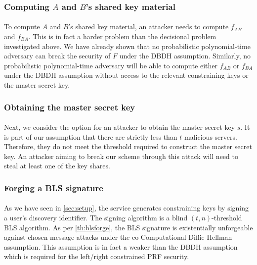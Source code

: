 \subsubsection{Computing $A$ and $B$'s shared key material}

\paragraph{} To compute $A$ and $B$'s shared key material, an attacker needs to compute $f_{AB}$ and $f_{BA}$. This is in fact a harder problem than the decisional problem investigated above. We have already shown that no probabilistic polynomial-time adversary can break the security of $F$ under the DBDH assumption. Similarly, no probabilistic polynomial-time adversary will be able to compute either $f_{AB}$ or $f_{BA}$ under the DBDH assumption without access to the relevant constraining keys or the master secret key.

\subsubsection{Obtaining the master secret key}

\paragraph{} Next, we consider the option for an attacker to obtain the master secret key $s$. It is part of our assumption that there are strictly less than $t$ malicious servers. Therefore, they do not meet the threshold required to construct the master secret key. An attacker aiming to break our scheme through this attack will need to steal at least one of the key shares.

\subsubsection{Forging a BLS signature}

\paragraph{} As we have seen in \autoref{sec:setup}, the service generates constraining keys by signing a user's discovery identifier. The signing algorithm is a blind $(t,n)$-threshold BLS algorithm. As per \autoref{th:blsforge}, the BLS signature is existentially unforgeable against chosen message attacks under the co-Computational Diffie Hellman assumption. This assumption is in fact a weaker than the DBDH assumption which is required for the left/right constrained PRF security.


